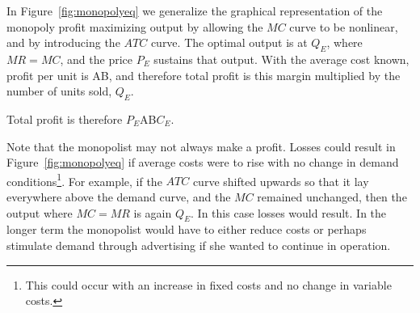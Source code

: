 In Figure~\ref{fig:monopolyeq} we generalize the graphical representation of the monopoly profit maximizing output by allowing the $MC$ curve to be nonlinear, and by introducing the $ATC$ curve. The optimal output is at $Q_E$, where $MR=MC$, and the price $P_E$ sustains that output. With the average cost known, profit per unit is AB, and therefore total profit is this margin multiplied by the number of units sold, $Q_E$.

Total profit is therefore $P_E$AB$C_E$. 

Note that the monopolist may not always make a profit. Losses could result in Figure~\ref{fig:monopolyeq} if average costs were to rise with no change in demand conditions\footnote{This could occur with an increase in fixed costs and no change in variable costs.}. For example, if the $ATC$ curve shifted upwards so that it lay everywhere above the demand curve, and the $MC$ remained unchanged, then the output where $MC=MR$ is again $Q_E$. In this case losses would result. In the longer term the monopolist would have to either reduce costs or perhaps stimulate demand through advertising if she wanted to continue in operation.

 
